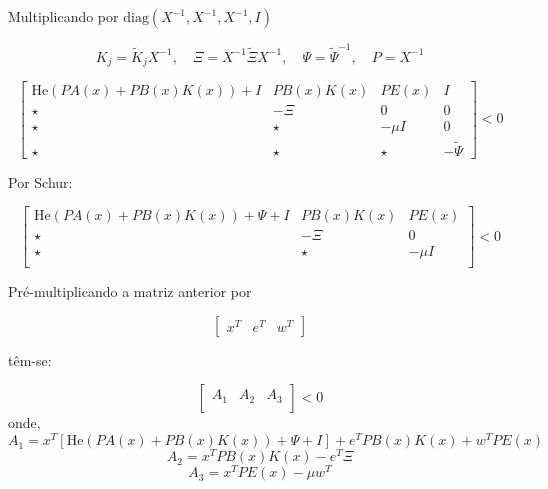 Multiplicando por $\text{diag}(X^{-1}, X^{-1}, X^{-1}, I)$

\begin{equation}
  K_j = \tilde K_j X^{-1}, \quad \Xi = X^{-1} \tilde \Xi X^{-1}, \quad \Psi = \tilde \Psi^{-1}, \quad P = X^{-1}
\end{equation}

\begin{equation}
  \begin{bmatrix}
    \text{He}(PA(x) + PB(x)K(x))  + I & PB(x)K(x) & P E(x) & I             \\
    \star                            & -\Xi      & 0      & 0             \\
    \star                            & \star     & -\mu I & 0             \\
    \star                            & \star     & \star  & - \tilde \Psi
  \end{bmatrix} < 0
\end{equation}

Por Schur:


\begin{equation}
  \begin{bmatrix}
    \text{He}(PA(x) + PB(x)K(x)) + \Psi  + I & PB(x)K(x) & P E(x) \\
    \star                                   & -\Xi      & 0      \\
    \star                                   & \star     & -\mu I \\
  \end{bmatrix} < 0
\end{equation}

Pré-multiplicando a matriz anterior por

\begin{equation}
  \begin{bmatrix}
    x^T & e^T & w^T
  \end{bmatrix}
\end{equation}

têm-se:


\begin{equation}
  \begin{bmatrix}
    A_1 & A_2 & A_3 \\
  \end{bmatrix} < 0
\end{equation}
onde,
\begin{equation}
  A_1 = x^T \left[\text{He}(PA(x) + PB(x)K(x)) + \Psi  + I\right] + e^TPB(x)K(x) + w^TPE(x)
\end{equation}
\begin{equation}
  A_2 = x^TPB(x)K(x) - e^T\Xi
\end{equation}
\begin{equation}
  A_3 = x^TPE(x) - \mu w^T
\end{equation}

